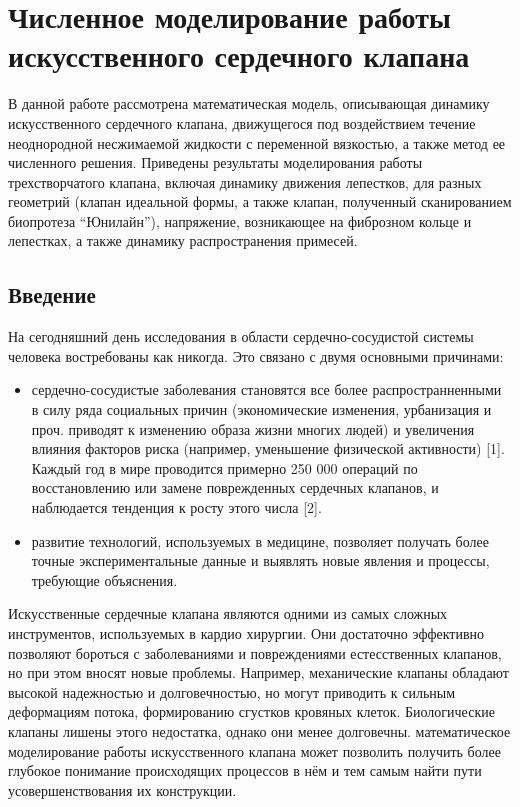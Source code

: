 \section{Численное моделирование работы искусственного сердечного
клапана}\label{ux447ux438ux441ux43bux435ux43dux43dux43eux435-ux43cux43eux434ux435ux43bux438ux440ux43eux432ux430ux43dux438ux435-ux440ux430ux431ux43eux442ux44b-ux438ux441ux43aux443ux441ux441ux442ux432ux435ux43dux43dux43eux433ux43e-ux441ux435ux440ux434ux435ux447ux43dux43eux433ux43e-ux43aux43bux430ux43fux430ux43dux430}

В данной работе рассмотрена математическая модель, описывающая динамику
искусственного сердечного клапана, движущегося под воздействием течение
неоднородной несжимаемой жидкости с переменной вязкостью, а также метод
ее численного решения. Приведены результаты моделирования работы
трехстворчатого клапана, включая динамику движения лепестков, для разных
геометрий (клапан идеальной формы, а также клапан, полученный
сканированием биопротеза ``Юнилайн''), напряжение, возникающее на
фиброзном кольце и лепестках, а также динамику распространения примесей.

\subsection{Введение}\label{ux432ux432ux435ux434ux435ux43dux438ux435}

На сегодняшний день исследования в области сердечно-сосудистой системы
человека востребованы как никогда. Это связано с двумя основными
причинами:

\begin{itemize}
\item
  сердечно-сосудистые заболевания становятся все более
  распространненными в силу ряда социальных причин (экономические
  изменения, урбанизация и проч. приводят к изменению образа жизни
  многих людей) и увеличения влияния факторов риска (например,
  уменьшение физической активности) {[}1{]}. Каждый год в мире
  проводится примерно 250 000 операций по восстановлению или замене
  поврежденных сердечных клапанов, и наблюдается тенденция к росту этого
  числа {[}2{]}.
\item
  развитие технологий, используемых в медицине, позволяет получать более
  точные экспериментальные данные и выявлять новые явления и процессы,
  требующие объяснения.
\end{itemize}

Искусственные сердечные клапана являются одними из самых сложных
инструментов, используемых в кардио хирургии. Они достаточно эффективно
позволяют бороться с заболеваниями и повреждениями естесственных
клапанов, но при этом вносят новые проблемы. Например, механические
клапаны обладают высокой надежностью и долговечностью, но могут
приводить к сильным деформациям потока, формированию сгустков кровяных
клеток. Биологические клапаны лишены этого недостатка, однако они менее
долговечны. математическое моделирование работы искусственного клапана
может позволить получить более глубокое понимание происходящих процессов
в нём и тем самым найти пути усовершенствования их конструкции.

